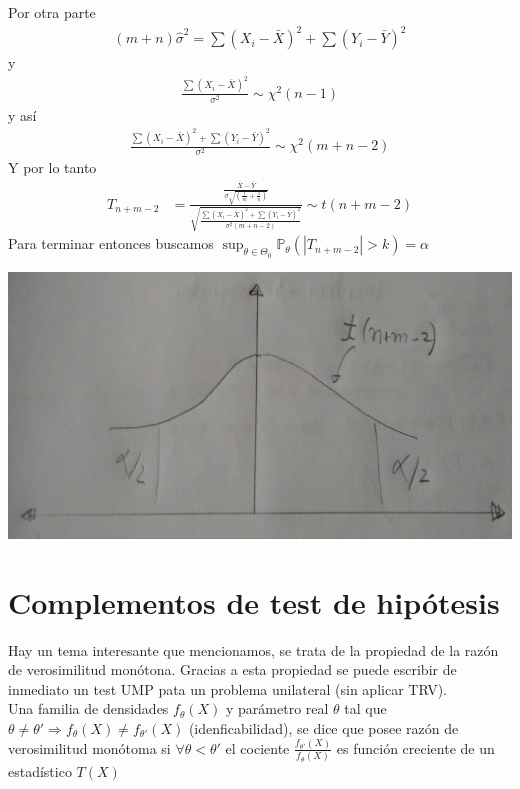 \documentclass[10pt]{article}
\theoremstyle{plain}
\theoremstyle{definition}
\begin{document}
Por otra parte
\begin{align*}
(m+n)\hat{\sigma}^2 = \sum (X_{i}-\bar{X})^2 + \sum (Y_{i}-\bar{Y})^2
\end{align*}
y
\begin{align*}
\frac{\sum (X_{i}-\bar{X})^2}{\sigma^2} \sim \chi^2(n-1)
\end{align*}
y así
\begin{align*}
\frac{\sum (X_{i}-\bar{X})^2+\sum (Y_{i}-\bar{Y})^2}{\sigma^2} \sim \chi^2(m+n-2)
\end{align*}
Y por lo tanto
\begin{align*}
T_{n+m-2} &= \frac{\frac{\bar{X}-\bar{Y}}{\sigma\sqrt{\left(\frac{1}{m}+\frac{1}{n}\right)}}}{\sqrt{\frac{\sum (X_{i}-\bar{X})^2+\sum (Y_{i}-\bar{Y})^2}{\sigma^2(m+n-2)}}} \sim t(n+m-2)
\end{align*}
Para terminar entonces buscamos $\sup_{\theta\in\Theta_{0}}\mathbb{P}_{\theta}(|T_{n+m-2}|>k) = \alpha$
\begin{center}
\includegraphics[scale=0.1]{imagenes/student.jpg}
\end{center}
\section{Complementos de test de hipótesis}
Hay un tema interesante que mencionamos, se trata de la propiedad de la razón de verosimilitud monótona. Gracias a esta propiedad se puede escribir de inmediato un test UMP pata un problema unilateral (sin aplicar TRV).\\

Una familia de densidades $f_{\theta}(X)$ y parámetro real $\theta$ tal que $\theta \not = \theta' \Rightarrow f_{\theta}(X) \not = f_{\theta'}(X)$ (idenficabilidad), se dice que posee razón de verosimilitud monótoma si $\forall \theta < \theta'$ el cociente $\frac{f_{\theta'}(X)}{f_{\theta}(X)}$ es función creciente de un estadístico $T(X)$
\end{document}
